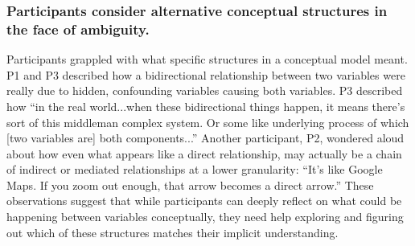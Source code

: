 \subsubsection{Participants consider alternative conceptual structures in the face of ambiguity.}
Participants grappled with what specific structures in a conceptual model meant. P1 and P3
described how a bidirectional relationship between two variables were really due
to hidden, confounding variables causing both variables. P3 described how ``in
the real world...when these bidirectional things happen, it means there's
sort of this middleman complex system. Or some like underlying process of which
[two variables are] both components...'' Another participant, P2, wondered aloud
about how even what appears like a direct relationship, may actually be a chain
of indirect or mediated relationships at a lower granularity: ``It's like Google
Maps. If you zoom out enough, that arrow becomes a direct arrow.'' These
observations suggest that while participants can deeply reflect on what could be
happening between variables conceptually, they need help exploring and
figuring out which of these structures matches their implicit understanding.


\begin{comment}
\subsubsection{More expressivity for specifying study designs/experimental design}
**keep short**
Additional observations about expressing study design
More future work for how to express study designs

TODO: Participant as a separate construct
\end{comment}

